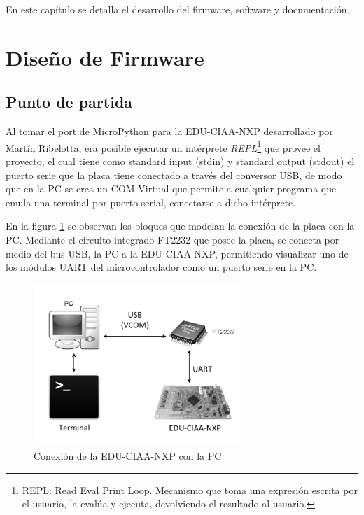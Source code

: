 En este capítulo se detalla el desarrollo del firmware, software y documentación.

\section{Diseño de Firmware}

\subsection{Punto de partida} 

Al tomar el port de MicroPython para la EDU-CIAA-NXP desarrollado por Martín Ribelotta, era posible ejecutar un intérprete \textit{REPL}\footnote{REPL: Read Eval Print Loop. Mecanismo que toma una expresión escrita por el usuario, la evalúa y ejecuta, devolviendo el resultado al usuario.} que provee el proyecto, el cual tiene como standard input (stdin) y standard output (stdout) el puerto serie que la placa tiene conectado a través del conversor USB, de modo que en la PC se crea un COM Virtual que permite a cualquier programa que emula una terminal por puerto serial, conectarse a dicho intérprete.

En la figura \ref{fig:conexion} se observan los bloques que modelan la conexión de la placa con la PC. Mediante el circuito integrado FT2232 que posee la placa, se conecta por medio del bus USB, la PC a la EDU-CIAA-NXP, permitiendo visualizar uno de los módulos UART del microcontrolador como un puerto serie en la PC.

\begin{figure}[h]
  \centering
    \includegraphics[width=0.7\textwidth]{Figures/fig_conexion}
  \caption{Conexión de la EDU-CIAA-NXP con la PC}
  \label{fig:conexion}
\end{figure}

